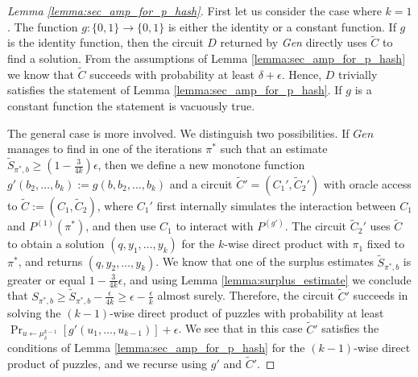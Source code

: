 \begin{proof}[Lemma \ref{lemma:sec_amp_for_p_hash}]
First let us consider the case where $k=1$. The function $g: \{0,1\} \rightarrow \{0,1\}$ is either the identity or a constant function.
If $g$ is the identity function, then the circuit $D$ returned by \textit{Gen} directly uses $\widetilde{C}$ to find a solution.
From the assumptions of Lemma \ref{lemma:sec_amp_for_p_hash} we know that $\widetilde{C}$ succeeds with probability at least
$\delta + \epsilon$. Hence, $D$ trivially satisfies the statement of Lemma \ref{lemma:sec_amp_for_p_hash}.
If $g$ is a constant function the statement is vacuously true.

The general case is more involved. We distinguish two possibilities.
If $Gen$ manages to find in one of the iterations $\pi^*$ such that an estimate
$\widetilde{S}_{\pi^*,b} \geq (1-\frac{3}{4k})\epsilon$, then we define a new monotone function
$g'(b_2, \dots, b_k) := g(b, b_2, \dots, b_k)$ and a circuit $\widetilde{C}' = (C_1', \widetilde{C}_2')$ with oracle access to $\widetilde{C} := (C_1, \widetilde{C}_2)$,
where $C_1'$ first internally simulates the interaction between $C_1$ and $P^{(1)}(\pi^*)$, and then use $C_1$ to interact with $P^{(g')}$.
The circuit $\widetilde{C}_2'$ uses $\widetilde{C}$ to obtain a solution $(q, y_1, \dots, y_k)$ for the $k$-wise direct product with $\pi_1$ fixed to $\pi^*$,
and returns $(q, y_2, \dots, y_k)$.
We know that one of the surplus estimates $\widetilde{S}_{\pi^*, b}$ is greater or equal $1 - \frac{3}{4k}\epsilon$, and using Lemma \ref{lemma:surplus_estimate}
we conclude that $S_{\pi^*,b} \geq \widetilde{S}_{\pi^*, b} - \frac{\epsilon}{4k} \geq \epsilon - \frac{\epsilon}{k}$ almost surely.
Therefore, the circuit $\widetilde{C}'$ succeeds in solving the $(k-1)$-wise direct product of puzzles with probability
at least $\Pr_{u \leftarrow \mu^{k-1}_{\delta}}[g'(u_1,\dots, u_{k-1} )] + \epsilon$.
We see that in this case $\widetilde{C}'$ satisfies the conditions of Lemma \ref{lemma:sec_amp_for_p_hash}
for the $(k-1)$-wise direct product of puzzles, and we recurse using $g'$ and $\widetilde{C}'$.


\end{proof}
